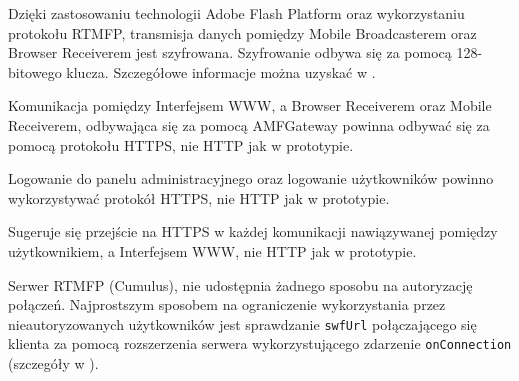 \begin{packed_item}
    \item{Dzięki zastosowaniu technologii Adobe Flash Platform oraz wykorzystaniu protokołu RTMFP, transmisja danych pomiędzy Mobile Broadcasterem oraz Browser Receiverem jest szyfrowana. Szyfrowanie odbywa się za pomocą 128-bitowego klucza. Szczegółowe informacje można uzyskać w \cite{AdobeSecurity}}.
    \item{Komunikacja pomiędzy Interfejsem WWW, a Browser Receiverem oraz Mobile Receiverem, odbywająca się za pomocą AMFGateway powinna odbywać się za pomocą protokołu HTTPS, nie HTTP jak w prototypie.}
    \item{Logowanie do panelu administracyjnego oraz logowanie użytkowników powinno wykorzystywać protokół HTTPS, nie HTTP jak w prototypie.}
    \item{Sugeruje się przejście na HTTPS w każdej komunikacji nawiązywanej pomiędzy użytkownikiem, a Interfejsem WWW, nie HTTP jak w prototypie.}
    \item{Serwer RTMFP (Cumulus), nie udostępnia żadnego sposobu na autoryzację połączeń. Najprostszym sposobem na ograniczenie wykorzystania przez nieautoryzowanych użytkowników jest sprawdzanie \texttt{swfUrl} połączającego się klienta za pomocą rozszerzenia serwera wykorzystującego zdarzenie \texttt{onConnection} (szczegóły w \cite{CumulusDocs}).}
\end{packed_item}

\newpage
